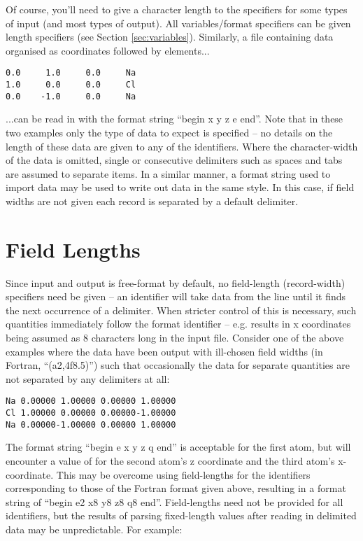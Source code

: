 Of course, you'll need to give a character length to the specifiers for some types of input (and most types of output). All variables/format specifiers can be given length specifiers (see Section \ref{sec:variables}).
Similarly, a file containing data organised as coordinates followed by elements...

\begin{verbatim}
0.0     1.0     0.0     Na
1.0     0.0     0.0     Cl
0.0    -1.0     0.0     Na
\end{verbatim}

...can be read in with the format string ``begin x y z e end''. Note that in these two examples only the type of data to expect is specified -- no details on the length of these data are given to any of the identifiers. Where the character-width of the data is omitted, single or consecutive delimiters such as spaces and tabs are assumed to separate items. In a similar manner, a format string used to import data may be used to write out data in the same style. In this case, if field widths are not given each record is separated by a default delimiter.

\section{Field Lengths}
Since input and output is free-format by default, no field-length (record-width) specifiers need be given -- an identifier will take data from the line until it finds the next occurrence of a delimiter. When stricter control of this is necessary, such quantities immediately follow the format identifier -- e.g.  results in x coordinates being assumed as 8 characters long in the input file. Consider one of the above examples where the data have been output with ill-chosen field widths (in Fortran, ``(a2,4f8.5)'') such that occasionally the data for separate quantities are not separated by any delimiters at all:

\begin{verbatim}
Na 0.00000 1.00000 0.00000 1.00000
Cl 1.00000 0.00000 0.00000-1.00000
Na 0.00000-1.00000 0.00000 1.00000
\end{verbatim}

The format string ``begin e x y z q end'' is acceptable for the first atom, but will encounter a value of  for the second atom’s z coordinate and the third atom’s x-coordinate. This may be overcome using field-lengths for the identifiers corresponding to those of the Fortran format given above, resulting in a format string of ``begin e2 x8 y8 z8 q8 end''. Field-lengths need not be provided for all identifiers, but the results of parsing fixed-length values after reading in delimited data may be unpredictable. For example:


